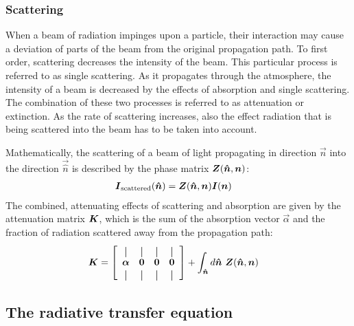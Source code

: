 \subsubsection{Scattering}

When a beam of radiation impinges upon a particle, their interaction may cause a
deviation of parts of the beam from the original propagation path. To first
order, scattering decreases the intensity of the beam. This particular process
is referred to as single scattering. As it propagates through the atmosphere,
the intensity of a beam is decreased by the effects of absorption and single
scattering. The combination of these two processes is referred to as attenuation
or extinction. As the rate of scattering increases, also the effect radiation
that is being scattered into the beam has to be taken into account.

Mathematically, the scattering of a beam of light propagating in direction
$\vec{n}$ into the direction $\vec{\hat{n}}$ is described by the phase
matrix $\boldsymbol{Z}(\boldsymbol{\hat{n}}, \boldsymbol{n})$:
\begin{align}
  \boldsymbol{I}_\text{scattered}(\boldsymbol{\hat{n}}) &= \boldsymbol{Z}(\boldsymbol{\hat{n}}, \boldsymbol{n}) \boldsymbol{I}(\boldsymbol{n})
\end{align}
The combined, attenuating effects of scattering and absorption are given by
the attenuation matrix $\boldsymbol{K}$, which is the sum of the absorption vector
$\vec{\alpha}$ and the fraction of radiation scattered away from the propagation
path:
\newcommand*{\vertbar}{\rule[-1ex]{0.5pt}{2.5ex}}
\newcommand*{\horzbar}{\rule[.5ex]{2.5ex}{0.5pt}}
\begin{align}
  \vec{K} &=
  \left [ \begin{array}{cccc}
      \vertbar & \vertbar & \vertbar & \vertbar \\
      \vec{\alpha} & \vec{0} & \vec{0} & \vec{0} \\
      \vertbar & \vertbar & \vertbar & \vertbar
    \end{array} \right ]
       + \int_{\vec{\hat{n}}} d\vec{\hat{n}}\ \mat{Z}(\vec{\hat{n}}, \vec{n})
\end{align}

\subsection{The radiative transfer equation}

